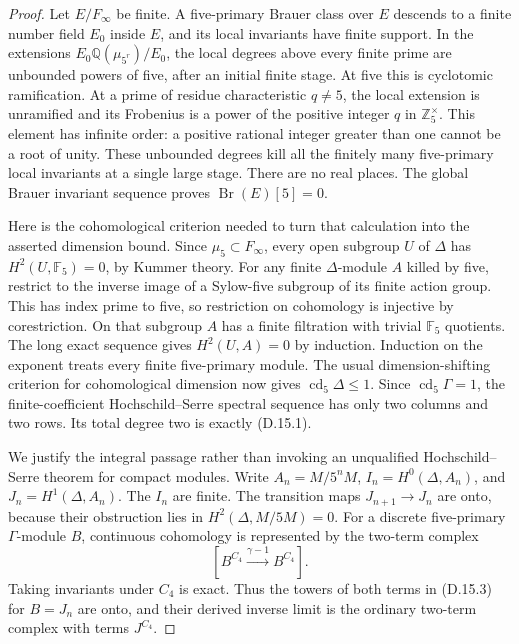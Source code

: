 \begin{proof}
Let \(E/F_\infty\) be finite. A five-primary Brauer class
over \(E\) descends to a finite number field \(E_0\)
inside \(E\), and its local invariants have finite support.
In the extensions \(E_0\mathbb Q(\mu_{5^r})/E_0\), the
local degrees above every finite prime are unbounded powers
of five, after an initial finite stage. At five this is
cyclotomic ramification. At a prime of residue characteristic
\(q\ne5\), the local extension is unramified and its
Frobenius is a power of the positive integer \(q\) in
\(\mathbb Z_5^\times\). This element has infinite order:
a positive rational integer greater than one cannot be a
root of unity. These unbounded degrees kill all the
finitely many five-primary local invariants at a single
large stage. There are no real places. The global Brauer
invariant sequence proves \(\operatorname{Br}(E)[5]=0\).

Here is the cohomological criterion needed to turn that
calculation into the asserted dimension bound. Since
\(\mu_5\subset F_\infty\), every open subgroup \(U\) of
\(\Delta\) has \(H^2(U,\mathbb F_5)=0\), by Kummer
theory. For any finite \(\Delta\)-module \(A\) killed
by five, restrict to the inverse image of a Sylow-five
subgroup of its finite action group. This has index prime
to five, so restriction on cohomology is injective by
corestriction. On that subgroup \(A\) has a finite
filtration with trivial \(\mathbb F_5\) quotients.
The long exact sequence gives \(H^2(U,A)=0\) by induction.
Induction on the exponent treats every finite five-primary
module. The usual dimension-shifting criterion for
cohomological dimension now gives \(\operatorname{cd}_5
\Delta\le1\). Since \(\operatorname{cd}_5\Gamma=1\),
the finite-coefficient Hochschild--Serre spectral sequence
has only two columns and two rows. Its total degree two
is exactly (D.15.1).

We justify the integral passage rather than invoking an
unqualified Hochschild--Serre theorem for compact modules.
Write \(A_n=M/5^nM\), \(I_n=H^0(\Delta,A_n)\), and
\(J_n=H^1(\Delta,A_n)\). The \(I_n\) are finite.
The transition maps \(J_{n+1}\to J_n\) are onto, because
their obstruction lies in \(H^2(\Delta,M/5M)=0\).
For a discrete five-primary \(\Gamma\)-module \(B\),
continuous cohomology is represented by the two-term complex
\[
 [B^{C_4}\xrightarrow{\gamma-1}B^{C_4}].                \tag{D.15.3}
\]
Taking invariants under \(C_4\) is exact. Thus the towers
of both terms in (D.15.3) for \(B=J_n\) are onto, and
their derived inverse limit is the ordinary two-term
complex with terms \(J^{C_4}\).


\end{proof}
